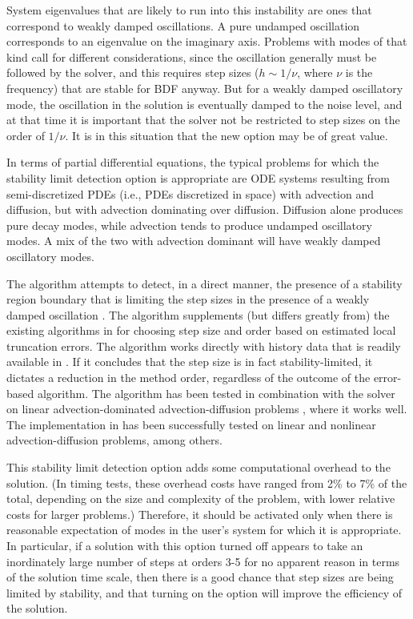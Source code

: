 System eigenvalues that are likely to run into this instability are
ones that correspond to weakly damped oscillations.  A pure undamped
oscillation corresponds to an eigenvalue on the imaginary axis.
Problems with modes of that kind call for different considerations,
since the oscillation generally must be followed by the solver, and
this requires step sizes ($h \sim 1/\nu$, where $\nu$ is the frequency)
that are stable for BDF anyway.  But for a weakly damped oscillatory mode,
the oscillation in the solution is eventually damped to the noise level,
and at that time it is important that the solver not be restricted to step
sizes on the order of $1/\nu$.  It is in this situation that the new option may
be of great value.

In terms of partial differential equations, the typical problems for
which the stability limit detection option is appropriate are
ODE systems resulting from semi-discretized PDEs (i.e., PDEs discretized
in space) with advection and diffusion, but with advection dominating
over diffusion.
Diffusion alone produces pure decay modes, while advection tends to
produce undamped oscillatory modes.  A mix of the two with advection
dominant will have weakly damped oscillatory modes.

The {\stald} algorithm attempts to detect, in a direct
manner, the presence of a stability region boundary that is limiting
the step sizes in the presence of a weakly damped oscillation \cite{Hin:92}.
The algorithm supplements (but differs greatly from) the existing
algorithms in {\cvodes} for choosing step size and order based on
estimated local truncation errors.  The {\stald} algorithm works directly
with history data that is readily available in {\cvodes}.  If it concludes
that the step size is in fact stability-limited, it dictates a
reduction in the method order, regardless of the outcome of the
error-based algorithm.  The {\stald} algorithm has been tested in
combination with the {\vode} solver on linear advection-dominated
advection-diffusion problems \cite{Hin:95}, where it works well.  The
implementation in {\cvodes} has been successfully tested on linear
and nonlinear advection-diffusion problems, among others.

This stability limit detection option adds some computational overhead
to the {\cvodes} solution.  (In timing tests, these overhead costs
have ranged from 2\% to 7\% of the total, depending on the size and
complexity of the problem, with lower relative costs for larger
problems.)  Therefore, it should be activated only when there is
reasonable expectation of modes in the user's system for which it is
appropriate.  In particular, if a {\cvode} solution with this option
turned off appears to take an inordinately large number of steps at
orders 3-5 for no apparent reason in terms of the solution time scale,
then there is a good chance that step sizes are being limited by
stability, and that turning on the option will improve the efficiency
of the solution.


